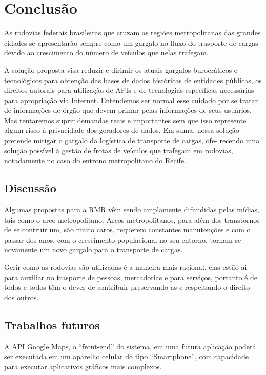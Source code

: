 \chapter{Conclusão}\label{intro:resumen}

As rodovias federais brasileiras que cruzam as regiões metropolitanas das grandes cidades se apresentarão sempre como um gargalo no 
fluxo do trasporte de cargas devido ao crescimento do número de veículos que nelas trafegam.

A solução proposta visa reduzir e dirimir os atuais gargalos burocráticos e tecnológicos
para obtenção das bases de dados históricas de entidades públicas, os direitos autorais 
para utilização de APIs e de tecnologias específicas necessárias para apropriação via Internet. 
Entendemos ser normal esse cuidado por se tratar de informações de órgão que devem primar 
pelas informações de seus usuários. Mas tentaremos suprir demandas reais e importantes 
sem que isso represente algum risco à privacidade dos geradores de dados. 
Em suma, nossa solução pretende mitigar o gargalo da logística de transporte de cargas, ofe-
recendo uma solução possível à gestão de frotas de veículos que trafegam em rodovias, 
notadamente no caso do entrono metropolitano do Recife.


\section{Discussão}

Algumas propostas para a RMR vêm sendo amplamente difundidas pelas mídias, tais como o arco metropolitano. Arcos metropolitanos, 
para além dos transtornos de se contruir um, são muito caros, requerem constantes manutenções  e com o passar dos anos, 
com o crescimento populacional no seu entorno, tornam-se novamente  um novo gargalo para o transporte de cargas.

Gerir como as rodovias são utilizadas é a maneira mais racional, elas estão ai para auxiliar no trasporte de pessoas, mercadorias e para serviços, portanto é de todos e todos têm o dever de contribuir preservando-as e respeitando o direito dos outros.


\section{Trabalhos futuros}


A API Google Maps, o ``front-end'' do sistema, em uma futura aplicação poderá ser executada em um aparelho 
celular do tipo ``Smartphone'', com capacidade para executar aplicativos gráficos mais complexos.